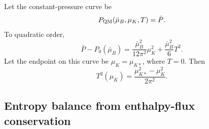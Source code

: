 Let the constant-pressure curve be
\begin{equation}
P_{\rm QM}(\bar\mu_B,\mu_K,T)=\bar P .
\end{equation}
To quadratic order,
\begin{equation}
\bar P-P_0(\bar\mu_B)
=
\frac{\bar\mu_B^2}{12\pi^2}\mu_K^2
+
\frac{\bar\mu_B^2}{6}T^2 .
\end{equation}
Let the endpoint on this curve be \(\mu_K=\mu_{K*}\), where \(T=0\). Then
\begin{equation}
T^2(\mu_K)
=
\frac{\mu_{K*}^2-\mu_K^2}{2\pi^2}.
\end{equation}

\subsection{Entropy balance from enthalpy-flux conservation}
\label{sec:entropy-from-enthalpy-flux}

